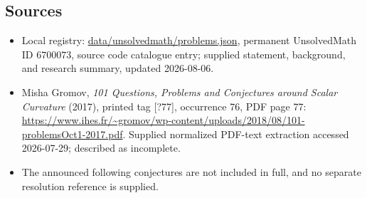 \documentclass[11pt]{article}
\begin{document}
\subsection{Sources}
\begin{itemize}
\item Local registry: \url{data/unsolvedmath/problems.json}, permanent UnsolvedMath ID \(6700073\), source code catalogue entry; supplied statement, background, and research summary, updated 2026-08-06.
\item Misha Gromov, \emph{101 Questions, Problems and Conjectures around Scalar Curvature} (2017), printed tag [?77], occurrence 76, PDF page 77: \url{https://www.ihes.fr/~gromov/wp-content/uploads/2018/08/101-problemsOct1-2017.pdf}. Supplied normalized PDF-text extraction accessed 2026-07-29; described as incomplete.
\item The announced following conjectures are not included in full, and no separate resolution reference is supplied.
\end{itemize}
\end{document}
